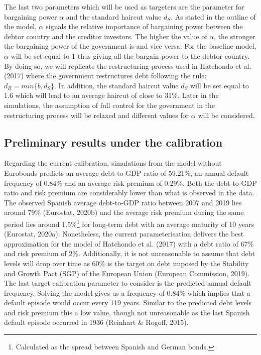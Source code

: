 The last two parameters which will be used as targeters are the parameter for bargaining power $\alpha$ and the standard haircut value $d_S$. As stated in the outline of the model, $\alpha$ signals the relative importance of bargaining power between the debtor country and the creditor investors. The higher the value of $\alpha$, the stronger the bargaining power of the government is and vice versa. For the baseline model, $\alpha$ will be set equal to 1 thus giving all the bargain power to the debtor country. By doing so, we will replicate the restructuring process used in Hatchondo et al. (2017) where the government restructures debt following the rule: $d_B = min\{b,d_S\}$. In addition, the standard haircut value $d_S$ will be set equal to 1.6 which will lead to an average haircut of close to 31\%. Later in the simulations, the assumption of full control for the government in the restructuring process will be relaxed and different values for $\alpha$ will be considered.\\

\subsection{Preliminary results under the calibration}
Regarding the current calibration, simulations from the model without Eurobonds predicts an average debt-to-GDP ratio of 59.21\%, an annual default frequency of 0.84\% and an average risk premium of 0.29\%. Both the debt-to-GDP ratio and risk premium are considerably lower than what is observed in the data. The observed Spanish average debt-to-GDP ratio between 2007 and 2019 lies around 79\% (Eurostat, 2020b) and the average risk premium during the same period lies around 1.5\%\footnote{Calculated as the spread between Spanish and German bonds.} for long-term debt with an average maturity of 10 years (Eurostat, 2020a). Nonetheless, the current parameterisation delivers the best approximation for the model of Hatchondo et al. (2017) with a debt ratio of 67\% and risk premium of 2\%. Additionally, it is not unreasonable to assume that debt levels will drop over time as 60\% is the target on debt imposed by the Stability and Growth Pact (SGP) of the European Union (European Commission, 2019). The last target calibration parameter to consider is the predicted annual default frequency. Solving the model gives us a frequency of 0.84\% which implies that a default episode would occur every 119 years. Similar to the predicted debt levels and risk premium this a low value, though not unreasonable as the last Spanish default episode occurred in 1936 (Reinhart \& Rogoff, 2015).

